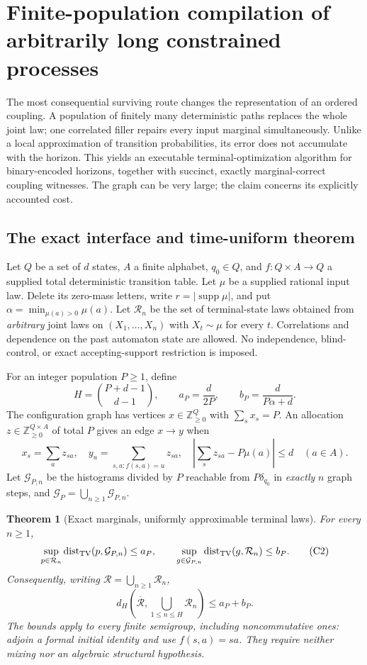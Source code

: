 \documentclass[11pt]{article}
\newtheorem{theorem}{Theorem}
\begin{document}
\section{Finite-population compilation of arbitrarily long constrained processes}\label{sec:population}

The most consequential surviving route changes the representation of an ordered coupling. A population of finitely many deterministic paths replaces the whole joint law; one correlated filler repairs every input marginal simultaneously. Unlike a local approximation of transition probabilities, its error does not accumulate with the horizon. This yields an executable terminal-optimization algorithm for binary-encoded horizons, together with succinct, exactly marginal-correct coupling witnesses. The graph can be very large; the claim concerns its explicitly accounted cost.

\subsection{The exact interface and time-uniform theorem}

Let $Q$ be a set of $d$ states, $A$ a finite alphabet, $q_0\in Q$, and $f:Q\times A\to Q$ a supplied total deterministic transition table. Let $\mu$ be a supplied rational input law. Delete its zero-mass letters, write $r=|\operatorname{supp}\mu|$, and put $\alpha=\min_{\mu(a)>0}\mu(a)$. Let $\mathcal R_n$ be the set of terminal-state laws obtained from \emph{arbitrary} joint laws on $(X_1,\ldots,X_n)$ with $X_t\sim\mu$ for every $t$. Correlations and dependence on the past automaton state are allowed. No independence, blind-control, or exact accepting-support restriction is imposed.

For an integer population $P\ge1$, define
\[
H=\binom{P+d-1}{d-1},\qquad a_P=\frac d{2P},\qquad
b_P=\frac d{P\alpha+d}.
\]
The configuration graph has vertices $x\in\mathbb Z_{\ge0}^Q$ with $\sum_sx_s=P$. An allocation $z\in\mathbb Z_{\ge0}^{Q\times A}$ of total $P$ gives an edge $x\to y$ when
\[
x_s=\sum_a z_{sa},\quad y_u=\sum_{s,a:f(s,a)=u}z_{sa},\quad
\left|\sum_s z_{sa}-P\mu(a)\right|\le d\quad(a\in A).
\tag{C1}
\]
Let $\mathcal G_{P,n}$ be the histograms divided by $P$ reachable from $P\delta_{q_0}$ in \emph{exactly} $n$ graph steps, and $\mathcal G_P=\bigcup_{n\ge1}\mathcal G_{P,n}$.

\begin{theorem}[Exact marginals, uniformly approximable terminal laws]\label{thm:population}
For every $n\ge1$,
\[
\sup_{p\in\mathcal R_n}\operatorname{dist}_{\rm TV}(p,\mathcal G_{P,n})\le a_P,
\qquad
\sup_{g\in\mathcal G_{P,n}}\operatorname{dist}_{\rm TV}(g,\mathcal R_n)\le b_P.
\tag{C2}
\]
Consequently, writing $\mathcal R=\bigcup_{n\ge1}\mathcal R_n$,
\[
d_H\left(\overline{\mathcal R},\bigcup_{1\le n\le H}\mathcal R_n\right)
\le a_P+b_P.
\tag{C3}
\]
The bounds apply to every finite semigroup, including noncommutative ones: adjoin a formal initial identity and use $f(s,a)=sa$. They require neither mixing nor an algebraic structural hypothesis.
\end{theorem}
\end{document}
